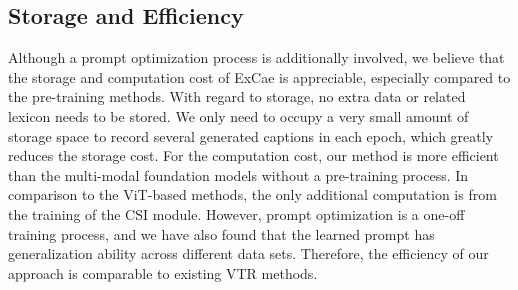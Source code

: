 \subsection{Storage and Efficiency}
Although a prompt optimization process is additionally involved, we believe that the storage and computation cost of ExCae is appreciable, especially compared to the pre-training methods. 
With regard to storage, no extra data or related lexicon needs to be stored. We only need to occupy a very small amount of storage space to record several generated captions in each epoch, which greatly reduces the storage cost. For the computation cost, our method is more efficient than the multi-modal foundation models without a pre-training process. In comparison to the ViT-based methods, the only additional computation is from the training of the CSI module. However, prompt optimization is a one-off training process, and we have also found that the learned prompt has generalization ability across different data sets. Therefore, the efficiency of our approach is comparable to existing VTR methods. 

